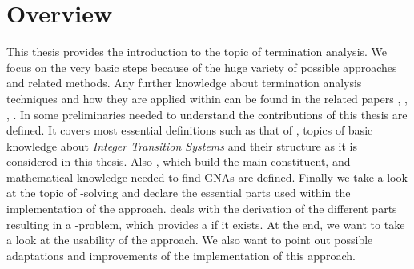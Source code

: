 \section{Overview}
\label{sec:overview}
This thesis provides the introduction to the topic of termination analysis. We focus on the very basic steps because of the huge variety of possible approaches and related methods. Any further knowledge about termination analysis techniques and how they are applied within \aprove can be found in the related papers \cite{giesl2017analyzing}, \cite{giesl2006aprove}, \cite{DBLP:stroder}, \cite{giesl2003aprove}.\newline
In  some preliminaries needed to understand the contributions of this thesis are defined. It covers most essential definitions such as that of \nonterm, topics of basic knowledge about \textit{Integer Transition Systems} and their structure as it is considered in this thesis. Also \gnas, which build the main constituent, and mathematical knowledge needed to find GNAs are defined. Finally we take a look at the topic of -solving and declare the essential parts used within the implementation of the approach.\newline
{} deals with the derivation of the different parts resulting in a -problem, which provides a \gna if it exists. \newline
At the end, we want to take a look at the usability of the approach. We also want to point out possible adaptations and improvements of the implementation of this approach.
